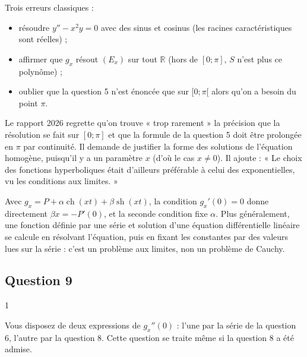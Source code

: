 \documentclass[11pt,a4paper]{article}
\providecommand{\tightlist}{\setlength{\itemsep}{0pt}\setlength{\parskip}{0pt}}
\begin{document}
\begin{piege}

Trois erreurs classiques :

\begin{itemize}
\tightlist
\item
  résoudre \(y''-x^2y=0\) avec des sinus et cosinus (les racines caractéristiques sont réelles) ;
\item
  affirmer que \(g_x\) résout \((E_x)\) sur tout \(\mathbb{R}\) (hors de \([0;\pi]\), \(S\) n'est plus ce polynôme) ;
\item
  oublier que la question 5 n'est énoncée que sur \([0;\pi[\) alors qu'on a besoin du point \(\pi\).
\end{itemize}

\end{piege}

\begin{jury}

Le rapport 2026 regrette qu'on trouve « trop rarement » la précision que la résolution se fait sur \([0;\pi]\) et que la formule de la question 5 doit être prolongée en \(\pi\) par continuité. Il demande de justifier la forme des solutions de l'équation homogène, puisqu'il y a un paramètre \(x\) (d'où le cas \(x\ne0\)). Il ajoute : « Le choix des fonctions hyperboliques était d'ailleurs préférable à celui des exponentielles, vu les conditions aux limites. »

\end{jury}

\begin{methode}

Avec \(g_x=P+\alpha\operatorname{ch}(xt)+\beta\operatorname{sh}(xt)\), la condition \(g_x'(0)=0\) donne directement \(\beta x=-P'(0)\), et la seconde condition fixe \(\alpha\). Plus généralement, une fonction définie par une série et solution d'une équation différentielle linéaire se calcule en résolvant l'équation, puis en fixant les constantes par des valeurs lues sur la série : c'est un problème aux limites, non un problème de Cauchy.

\end{methode}

\hypertarget{question-9}{%
\subsection{Question 9}\label{question-9}}

\begin{indication}{1}

Vous disposez de deux expressions de \(g_x''(0)\) : l'une par la série de la question 6, l'autre par la question 8. Cette question se traite même si la question 8 a été admise.

\end{indication}
\end{document}
